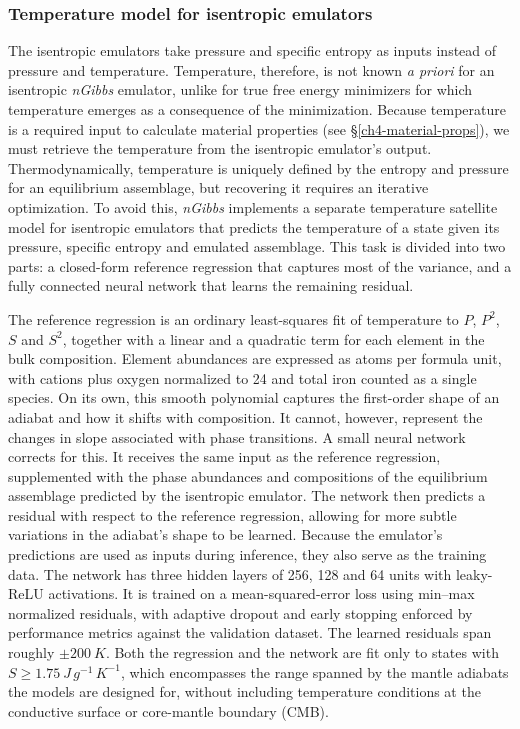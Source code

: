 \subsubsection{Temperature model for isentropic emulators}
 
The isentropic emulators take pressure and specific entropy as inputs instead of 
pressure and temperature. Temperature, therefore, is not known \emph{a priori} for an isentropic \emph{nGibbs} 
emulator, unlike for true free energy minimizers for which temperature emerges as a consequence of the minimization. Because temperature is a required input to calculate material properties
(see \S\ref{ch4-material-props}), we must retrieve the temperature from the isentropic emulator's output. Thermodynamically, 
temperature is uniquely defined by the entropy and pressure for an equilibrium assemblage, but recovering it requires an iterative 
optimization. To avoid this, \emph{nGibbs} implements a separate temperature satellite model for isentropic emulators that predicts the temperature of 
a state given its pressure, specific entropy and emulated assemblage. This task is divided into two parts: a closed-form reference regression that captures 
most of the variance, and a fully connected neural network that learns the remaining residual.
 
The reference regression is an ordinary least-squares fit of temperature to $P$,
$P^2$, $S$ and $S^2$, together with a linear and a quadratic term for each element in
the bulk composition. Element abundances are expressed as atoms per formula unit, with
cations plus oxygen normalized to 24 and total iron counted as a single species. On its
own, this smooth polynomial captures the first-order shape of an adiabat and how it
shifts with composition. It cannot, however, represent the changes in slope associated with phase transitions.
A small neural network corrects for this. It receives the same input as the reference regression, supplemented with the phase abundances and
compositions of the equilibrium assemblage predicted by the isentropic emulator. The network then predicts a residual with 
respect to the reference regression, allowing for more subtle variations in the adiabat's shape to be learned. Because the
emulator's predictions are used as inputs during inference, they also serve as the training data. The
network has three hidden layers of 256, 128 and 64 units with leaky-ReLU activations.
It is trained on a mean-squared-error loss using min--max normalized residuals, with
adaptive dropout and early stopping enforced by performance metrics against the validation dataset. The learned residuals span
roughly $\pm\SI{200}{K}$. Both the regression and the network are fit only to states with
$S \geq \SI{1.75}{J\,g^{-1}\,K^{-1}}$, which encompasses the range spanned by the mantle adiabats
the models are designed for, without including temperature conditions at the conductive surface or core-mantle boundary (CMB).
 
